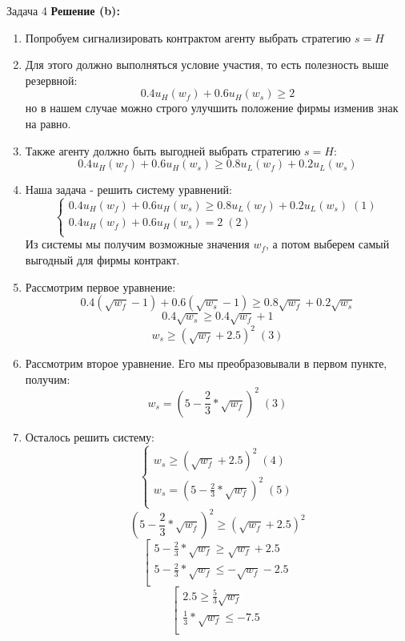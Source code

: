 \begin{mybox}{Задача 4}
    \textbf{Решение (b):}
    \begin{enumerate}
        \item Попробуем сигнализировать контрактом агенту выбрать стратегию $s=H$
        \item Для этого должно выполняться условие участия, то есть полезность выше резервной: $$0.4u_H(w_f)+0.6u_H(
        w_s)\geq2$$ но в нашем случае можно строго улучшить положение фирмы изменив знак на равно.
        \item Также агенту должно быть выгодней выбрать стратегию $s=H$: $$0.4u_H(w_f)+0.6u_H(w_s)\geq0.8u_L(w_f)+0
        .2u_L(w_s)$$
        \item Наша задача - решить систему уравнений: $$\begin{cases}
            0.4u_H(w_f)+0.6u_H(w_s)\geq0.8u_L(w_f)+0.2u_L(w_s) \;(1)\\
            0.4u_H(w_f)+0.6u_H(w_s)=2\; (2) \\
        \end{cases}$$
        Из системы мы получим возможные значения $w_f$, а потом выберем самый выгодный для фирмы контракт.
        \item Рассмотрим первое уравнение: $$0.4(\sqrt{w_f}-1)+0.6(\sqrt{w_s}-1)\geq0.8\sqrt{w_f}+0.2\sqrt{w_s}$$
        $$0.4\sqrt{w_s}\geq0.4\sqrt{w_f}+1$$
        $$w_s\geq(\sqrt{w_f}+2.5)^2\; (3)$$
        \item Рассмотрим второе уравнение. Его мы преобразовывали в первом пункте, получим: $$w_s=(5-\frac{2}{3}*\sqrt{w_f})^2\;(3)$$
        \item Осталось решить систему: $$\begin{cases}
            w_s\geq(\sqrt{w_f}+2.5)^2\; (4) \\
            w_s=(5-\frac{2}{3}*\sqrt{w_f})^2\;(5) \\
        \end{cases}$$
        $$(5-\frac{2}{3}*\sqrt{w_f})^2\geq(\sqrt{w_f}+2.5)^2$$
        $$\left[
          \begin{gathered}
              5-\frac{2}{3}*\sqrt{w_f}\geq\sqrt{w_f}+2.5 \\
              5-\frac{2}{3}*\sqrt{w_f}\leq-\sqrt{w_f}-2.5 \\
          \end{gathered}
        \right.$$
        $$\left[
          \begin{gathered}
              2.5\geq\frac{5}{3}\sqrt{w_f} \\
              \frac{1}{3}*\sqrt{w_f}\leq-7.5 \\

\end{gathered}$$
\end{enumerate}
\end{mybox}
